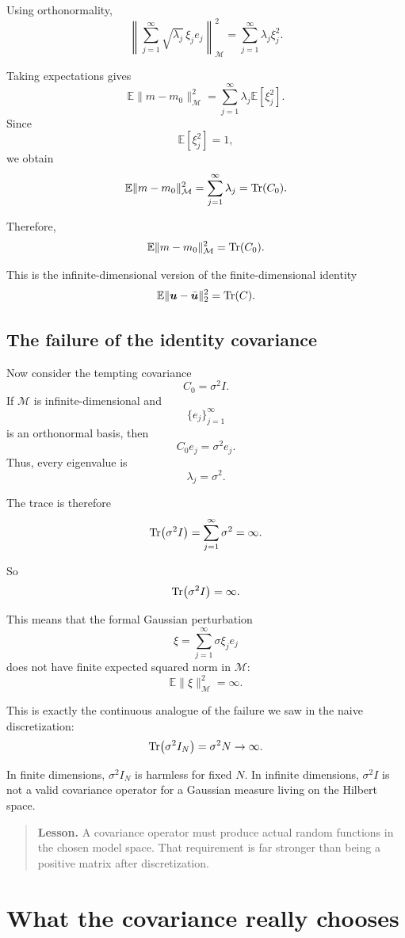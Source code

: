 \documentclass[11pt,a4paper]{book}
\newenvironment{lesson}
  {\begin{quote}\textbf{Lesson.}}
  {\end{quote}}
\newcommand{\M}{\mathcal{M}}      %
\newcommand{\E}{\mathbb{E}}
\begin{document}
Using orthonormality,
\[
    \left\|
        \sum_{j=1}^{\infty}
        \sqrt{\lambda_j}\,\xi_j e_j
    \right\|_{\M}^2
    =
    \sum_{j=1}^{\infty}
    \lambda_j\xi_j^2.
\]

Taking expectations gives
\[
    \mathbb{E}\|m-m_0\|_{\M}^2
    =
    \sum_{j=1}^{\infty}
    \lambda_j
    \mathbb{E}[\xi_j^2].
\]
Since
\[
    \mathbb{E}[\xi_j^2]=1,
\]
we obtain
\[
    \mathbb{E}\|m-m_0\|_{\M}^2
    =
    \sum_{j=1}^{\infty}\lambda_j
    =
    \Tr(C_0).
\]

Therefore,
\[
    \E\|m-m_0\|_{\M}^2
    =
    \Tr(C_0).
\]

This is the infinite-dimensional version of the finite-dimensional identity
\[
    \mathbb{E}\|\bm{u}-\bar{\bm{u}}\|_2^2
    =
    \Tr(C).
\]

\subsection{The failure of the identity covariance}

Now consider the tempting covariance
\[
    C_0 = \sigma^2 I.
\]
If $\M$ is infinite-dimensional and
\[
    \{e_j\}_{j=1}^{\infty}
\]
is an orthonormal basis, then
\[
    C_0 e_j = \sigma^2 e_j.
\]
Thus, every eigenvalue is
\[
    \lambda_j=\sigma^2.
\]

The trace is therefore
\[
    \Tr(\sigma^2 I)
    =
    \sum_{j=1}^{\infty}\sigma^2
    =
    \infty.
\]

So
\[
    \Tr(\sigma^2 I) = \infty.
\]

This means that the formal Gaussian perturbation
\[
    \xi
    =
    \sum_{j=1}^{\infty}
    \sigma \xi_j e_j
\]
does not have finite expected squared norm in $\M$:
\[
    \mathbb{E}\|\xi\|_{\M}^2
    =
    \infty.
\]

This is exactly the continuous analogue of the failure we saw in the naive
discretization:
\[
    \Tr(\sigma^2 I_N)=\sigma^2 N\to\infty.
\]

In finite dimensions, $\sigma^2 I_N$ is harmless for fixed $N$. In infinite
dimensions, $\sigma^2 I$ is not a valid covariance operator for a Gaussian
measure living on the Hilbert space.

\begin{lesson}
A covariance operator must produce actual random functions in the chosen model
space. That requirement is far stronger than being a positive matrix after
discretization.
\end{lesson}

\section{What the covariance really chooses}
\end{document}
